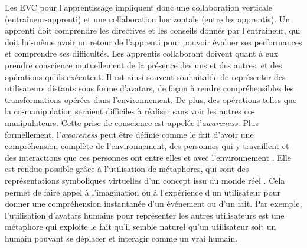 \documentclass[11pt]{article}
\begin{document}
Les EVC pour l'apprentissage impliquent donc une collaboration verticale (entraîneur-apprenti) et une collaboration horizontale (entre les apprentis). Un apprenti doit comprendre les directives et les conseils donnés par l'entraîneur, qui doit lui-même avoir un retour de l'apprenti pour pouvoir évaluer ses performances et comprendre ses difficultés. Les apprentis collaborant doivent quant à eux prendre conscience mutuellement de la présence des uns et des autres, et des opérations qu'ils exécutent. Il est ainsi souvent souhaitable de représenter des utilisateurs distants sous forme d'avatars, de façon à rendre compréhensibles les transformations opérées dans l'environnement. De plus, des opérations telles que la co-manipulation seraient difficiles à réaliser sans voir les autres co-manipulateurs. Cette prise de conscience est appelée l'\textit{awareness}. Plus formellement, l'\textit{awareness} peut être définie comme le fait d'avoir une compréhension complète de l'environnement, des personnes qui y travaillent et des interactions que ces personnes ont entre elles et avec l'environnement \cite{survey}. Elle est rendue possible grâce à l'utilisation de métaphores, qui sont des représentations symboliques virtuelles d'un concept issu du monde réel \cite{trv4-intro}. Cela permet de faire appel à l'imagination ou à l'expérience d'un utilisateur pour donner une compréhension instantanée d'un événement ou d'un fait. Par exemple, l'utilisation d'avatars humains pour représenter les autres utilisateurs est une métaphore qui exploite le fait qu'il semble naturel qu'un utilisateur soit un humain pouvant se déplacer et interagir comme un vrai humain.
\\
\end{document}
